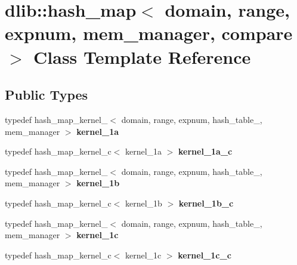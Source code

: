 \hypertarget{classdlib_1_1hash__map}{
\section{dlib::hash\_\-map$<$ domain, range, expnum, mem\_\-manager, compare $>$ Class Template Reference}
\label{classdlib_1_1hash__map}
}
\subsection*{Public Types}
\begin{DoxyCompactItemize}
\item 
\hypertarget{classdlib_1_1hash__map_a8eb280153ad2c7e79b47baaed73b7bd9}{
typedef hash\_\-map\_\-kernel\_$<$ domain, range, expnum, hash\_\-table\_, mem\_\-manager $>$ {\bfseries kernel\_\-1a}}
\label{classdlib_1_1hash__map_a8eb280153ad2c7e79b47baaed73b7bd9}

\item 
\hypertarget{classdlib_1_1hash__map_a15447377965b2d52de081028e7005024}{
typedef hash\_\-map\_\-kernel\_\-c$<$ kernel\_\-1a $>$ {\bfseries kernel\_\-1a\_\-c}}
\label{classdlib_1_1hash__map_a15447377965b2d52de081028e7005024}

\item 
\hypertarget{classdlib_1_1hash__map_aa3713b56d523e9539fc503442d727b52}{
typedef hash\_\-map\_\-kernel\_$<$ domain, range, expnum, hash\_\-table\_, mem\_\-manager $>$ {\bfseries kernel\_\-1b}}
\label{classdlib_1_1hash__map_aa3713b56d523e9539fc503442d727b52}

\item 
\hypertarget{classdlib_1_1hash__map_aa90abac9f060bb48036dec6e7d851e0f}{
typedef hash\_\-map\_\-kernel\_\-c$<$ kernel\_\-1b $>$ {\bfseries kernel\_\-1b\_\-c}}
\label{classdlib_1_1hash__map_aa90abac9f060bb48036dec6e7d851e0f}

\item 
\hypertarget{classdlib_1_1hash__map_a142a6f1b677afb755c6c2d0fcda09052}{
typedef hash\_\-map\_\-kernel\_$<$ domain, range, expnum, hash\_\-table\_, mem\_\-manager $>$ {\bfseries kernel\_\-1c}}
\label{classdlib_1_1hash__map_a142a6f1b677afb755c6c2d0fcda09052}

\item 
\hypertarget{classdlib_1_1hash__map_a405790287ae2018cb9249567256279b8}{
typedef hash\_\-map\_\-kernel\_\-c$<$ kernel\_\-1c $>$ {\bfseries kernel\_\-1c\_\-c}}
\label{classdlib_1_1hash__map_a405790287ae2018cb9249567256279b8}

\end{DoxyCompactItemize}
